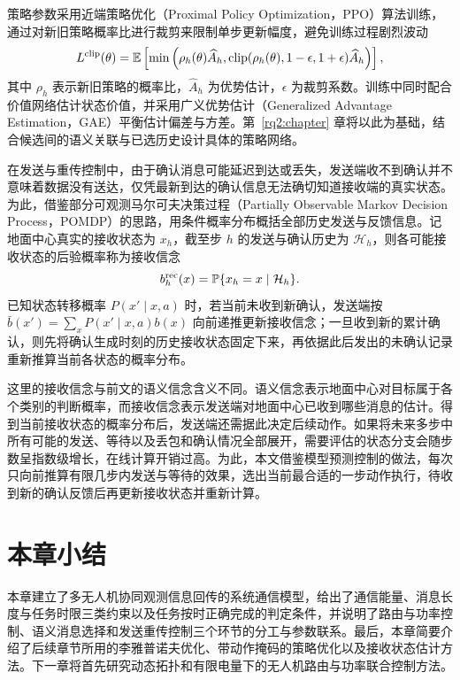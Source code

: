 策略参数采用近端策略优化（Proximal Policy Optimization，PPO）算法训练，通过对新旧策略概率比进行裁剪来限制单步更新幅度，避免训练过程剧烈波动\cite{ppo}
\begin{equation}
L^{\rm clip}(\theta)=\mathbb{E}\left[
\min\left(\rho_h(\theta)\widehat A_h,
\operatorname{clip}(\rho_h(\theta),1-\epsilon,1+\epsilon)\widehat A_h\right)\right],
\label{eq:base:ppo}
\end{equation}
其中 $\rho_h$ 表示新旧策略的概率比，$\widehat A_h$ 为优势估计，$\epsilon$ 为裁剪系数。训练中同时配合价值网络估计状态价值，并采用广义优势估计（Generalized Advantage Estimation，GAE）平衡估计偏差与方差\cite{gae}。第~\ref{rq2:chapter} 章将以此为基础，结合候选间的语义关联与已选历史设计具体的策略网络。

在发送与重传控制中，由于确认消息可能延迟到达或丢失，发送端收不到确认并不意味着数据没有送达，仅凭最新到达的确认信息无法确切知道接收端的真实状态。为此，借鉴部分可观测马尔可夫决策过程（Partially Observable Markov Decision Process，POMDP）的思路，用条件概率分布概括全部历史发送与反馈信息\cite{kaelbling1998pomdp}。记地面中心真实的接收状态为 $x_h$，截至步 $h$ 的发送与确认历史为 $\mathcal H_h$，则各可能接收状态的后验概率称为接收信念
\begin{equation}
b^{\rm rec}_h(x)=\mathbb{P}\{x_h=x\mid\mathcal H_h\}.
\label{eq:base:reception-belief}
\end{equation}
已知状态转移概率 $P(x'\mid x,a)$ 时，若当前未收到新确认，发送端按 $\bar b(x')=\sum_xP(x'\mid x,a)b(x)$ 向前递推更新接收信念；一旦收到新的累计确认，则先将确认生成时刻的历史接收状态固定下来，再依据此后发出的未确认记录重新推算当前各状态的概率分布。

这里的接收信念与前文的语义信念含义不同。语义信念表示地面中心对目标属于各个类别的判断概率，而接收信念表示发送端对地面中心已收到哪些消息的估计。得到当前接收状态的概率分布后，发送端还需据此决定后续动作。如果将未来多步中所有可能的发送、等待以及丢包和确认情况全部展开，需要评估的状态分支会随步数呈指数级增长，在线计算开销过高。为此，本文借鉴模型预测控制的做法\cite{mayne2000mpc}，每次只向前推算有限几步内发送与等待的效果，选出当前最合适的一步动作执行，待收到新的确认反馈后再更新接收状态并重新计算。

\section{本章小结}

本章建立了多无人机协同观测信息回传的系统通信模型，给出了通信能量、消息长度与任务时限三类约束以及任务按时正确完成的判定条件，并说明了路由与功率控制、语义消息选择和发送重传控制三个环节的分工与参数联系。最后，本章简要介绍了后续章节所用的李雅普诺夫优化、带动作掩码的策略优化以及接收状态估计方法。下一章将首先研究动态拓扑和有限电量下的无人机路由与功率联合控制方法。